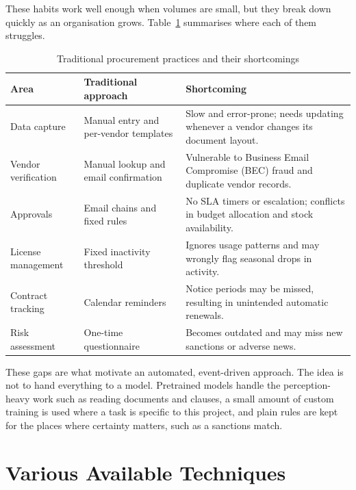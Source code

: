 These habits work well enough when volumes are small, but they break down quickly as an organisation grows. Table~\ref{tab:traditional} summarises where each of them struggles.

\begin{table}[!htbp]
\centering
\footnotesize
\renewcommand{\arraystretch}{1.2}
\caption{Traditional procurement practices and their shortcomings}
\label{tab:traditional}
\begin{tabular}{|p{}|p{}|p{}|}
\hline
\raggedright \textbf{Area} & \raggedright \textbf{Traditional approach} & \raggedright \textbf{Shortcoming} \tabularnewline \hline
\raggedright Data capture & \raggedright Manual entry and per-vendor templates & \raggedright Slow and error-prone; needs updating whenever a vendor changes its document layout. \tabularnewline \hline
\raggedright Vendor verification & \raggedright Manual lookup and email confirmation & \raggedright Vulnerable to Business Email Compromise (BEC) fraud and duplicate vendor records. \tabularnewline \hline
\raggedright Approvals & \raggedright Email chains and fixed rules & \raggedright No SLA timers or escalation; conflicts in budget allocation and stock availability. \tabularnewline \hline
\raggedright License management & \raggedright Fixed inactivity threshold & \raggedright Ignores usage patterns and may wrongly flag seasonal drops in activity. \tabularnewline \hline
\raggedright Contract tracking & \raggedright Calendar reminders & \raggedright Notice periods may be missed, resulting in unintended automatic renewals. \tabularnewline \hline
\raggedright Risk assessment & \raggedright One-time questionnaire & \raggedright Becomes outdated and may miss new sanctions or adverse news. \tabularnewline \hline
\end{tabular}
\end{table}

These gaps are what motivate an automated, event-driven approach. The idea is not to hand everything to a model. Pretrained models handle the perception-heavy work such as reading documents and clauses, a small amount of custom training is used where a task is specific to this project, and plain rules are kept for the places where certainty matters, such as a sanctions match.

\section{Various Available Techniques}

